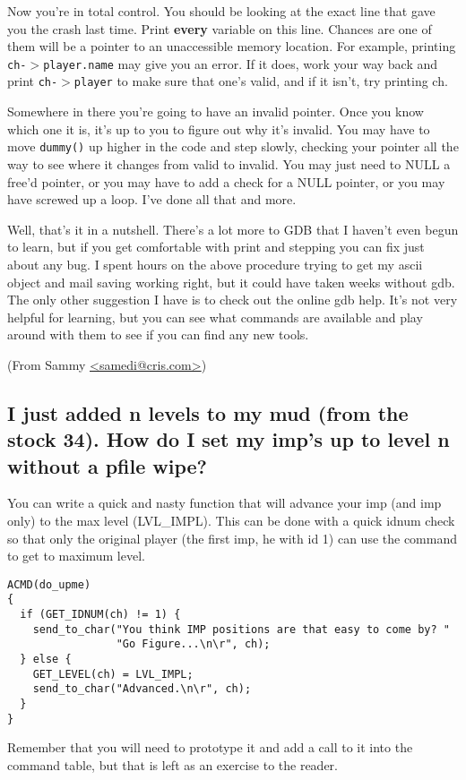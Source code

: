 \documentclass[11pt]{article}
\begin{document}
Now you're in total control.  You should be looking at the exact line that gave you the crash last time.  Print {\bf every} variable on this line. Chances are one of them will be a pointer to an unaccessible memory location.  For example, printing \texttt{ch-$>$player.name} may give you an error.  If it does, work your way back and print \texttt{ch-$>$player} to make sure that one's valid, and if it isn't, try printing ch.
\par
Somewhere in there you're going to have an invalid pointer.  Once you know which one it is, it's up to you to figure out why it's invalid.  You may have to move \texttt{dummy()} up higher in the code and step slowly, checking your pointer all the way to see where it changes from valid to invalid. You may just need to NULL a free'd pointer, or you may have to add a check for a NULL pointer, or you may have screwed up a loop.  I've done all that and more.
\par
Well, that's it in a nutshell.  There's a lot more to GDB that I haven't even begun to learn, but if you get comfortable with print and stepping you can fix just about any bug.  I spent hours on the above procedure trying to get my ascii object and mail saving working right, but it could have taken weeks without gdb.  The only other suggestion I have is to check out the online gdb help.  It's not very helpful for learning, but you can see what commands are available and play around with them to see if you can find any new tools.
\par
(From Sammy \url{<samedi@cris.com>})

\subsection{I just added n levels to my mud (from the stock 34).  How do I set my imp's up to level n without a pfile wipe?}
You can write a quick and nasty function that will advance your imp (and imp only) to the max level (LVL\_IMPL).  This can be done with a quick idnum check so that only the original player (the first imp, he with id 1) can use the command to get to maximum level. 
\begin{verbatim}
ACMD(do_upme)
{
  if (GET_IDNUM(ch) != 1) {
    send_to_char("You think IMP positions are that easy to come by? "
                 "Go Figure...\n\r", ch);
  } else {
    GET_LEVEL(ch) = LVL_IMPL;
    send_to_char("Advanced.\n\r", ch);
  }
}
\end{verbatim}
Remember that you will need to prototype it and add a call to it into the command table, but that is left as an exercise to the reader.
\end{document}
